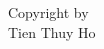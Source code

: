 \thispagestyle{empty}
\pagebreak
    \hspace{0pt}
    \vfill
      \begin{center}
        Copyright \textcopyright \hspace{0.4mm} by \\
        \bigskip 
        Tien Thuy Ho \\
      \end{center}
    \vfill
    \hspace{0pt}
\pagebreak